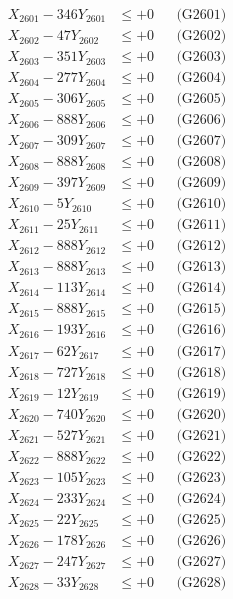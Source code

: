\documentclass[a4paper,10pt]{article}
\begin{document}
{\begin{align}
\allowbreak
X_{2601} - 346Y_{2601} &\leq +0 && \text{(G2601)} \\
X_{2602} - 47Y_{2602} &\leq +0 && \text{(G2602)} \\
X_{2603} - 351Y_{2603} &\leq +0 && \text{(G2603)} \\
X_{2604} - 277Y_{2604} &\leq +0 && \text{(G2604)} \\
X_{2605} - 306Y_{2605} &\leq +0 && \text{(G2605)} \\
X_{2606} - 888Y_{2606} &\leq +0 && \text{(G2606)} \\
X_{2607} - 309Y_{2607} &\leq +0 && \text{(G2607)} \\
X_{2608} - 888Y_{2608} &\leq +0 && \text{(G2608)} \\
X_{2609} - 397Y_{2609} &\leq +0 && \text{(G2609)} \\
X_{2610} - 5Y_{2610} &\leq +0 && \text{(G2610)} \\
\allowbreak
X_{2611} - 25Y_{2611} &\leq +0 && \text{(G2611)} \\
X_{2612} - 888Y_{2612} &\leq +0 && \text{(G2612)} \\
X_{2613} - 888Y_{2613} &\leq +0 && \text{(G2613)} \\
X_{2614} - 113Y_{2614} &\leq +0 && \text{(G2614)} \\
X_{2615} - 888Y_{2615} &\leq +0 && \text{(G2615)} \\
X_{2616} - 193Y_{2616} &\leq +0 && \text{(G2616)} \\
X_{2617} - 62Y_{2617} &\leq +0 && \text{(G2617)} \\
X_{2618} - 727Y_{2618} &\leq +0 && \text{(G2618)} \\
X_{2619} - 12Y_{2619} &\leq +0 && \text{(G2619)} \\
X_{2620} - 740Y_{2620} &\leq +0 && \text{(G2620)} \\
\allowbreak
X_{2621} - 527Y_{2621} &\leq +0 && \text{(G2621)} \\
X_{2622} - 888Y_{2622} &\leq +0 && \text{(G2622)} \\
X_{2623} - 105Y_{2623} &\leq +0 && \text{(G2623)} \\
X_{2624} - 233Y_{2624} &\leq +0 && \text{(G2624)} \\
X_{2625} - 22Y_{2625} &\leq +0 && \text{(G2625)} \\
X_{2626} - 178Y_{2626} &\leq +0 && \text{(G2626)} \\
X_{2627} - 247Y_{2627} &\leq +0 && \text{(G2627)} \\
X_{2628} - 33Y_{2628} &\leq +0 && \text{(G2628)} \\

\end{align}}
\end{document}
